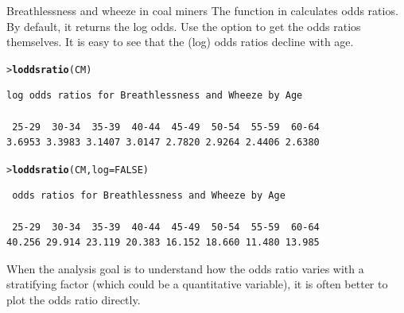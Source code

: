\documentclass[10pt,krantz2]{krantz}\usepackage[]{graphicx}\usepackage[]{color}
\makeatletter
\newcommand{\hlnum}[1]{\textcolor[rgb]{0.686,0.059,0.569}{#1}}%
\newcommand{\hlstd}[1]{\textcolor[rgb]{0.345,0.345,0.345}{#1}}%
\newcommand{\hlkwc}[1]{\textcolor[rgb]{0.333,0.667,0.333}{#1}}%
\newcommand{\hlkwd}[1]{\textcolor[rgb]{0.737,0.353,0.396}{\textbf{#1}}}%
\newenvironment{kframe}{%
 \def\at@end@of@kframe{}%
 \ifinner\ifhmode%
  \def\at@end@of@kframe{\end{minipage}}%
  \begin{minipage}{\columnwidth}%
 \fi\fi%
 \def\FrameCommand##1{\hskip\@totalleftmargin \hskip-\fboxsep
 \colorbox{shadecolor}{##1}\hskip-\fboxsep
     \hskip-\linewidth \hskip-\@totalleftmargin \hskip\columnwidth}%
 \MakeFramed {\advance\hsize-\width
   \@totalleftmargin\z@ \linewidth\hsize
   \@setminipage}}%
 {\par\unskip\endMakeFramed%
 \at@end@of@kframe}
\newenvironment{knitrout}{}{} %
\renewenvironment{knitrout}{\small\renewcommand{\baselinestretch}{.85}}{} %
\makeatother
\begin{document}
\begin{Example}[wheeze1]{Breathlessness and wheeze in coal miners}
The  function in  calculates odds ratios.  
By default, it returns the
log odds.  Use the option  to get the odds ratios
themselves.  It is easy to see that the (log) odds ratios decline
with age.
\begin{knitrout}
\color{fgcolor}\begin{kframe}
\begin{alltt}
\hlstd{> }\hlkwd{loddsratio}\hlstd{(CM)}
\end{alltt}
\begin{verbatim}
log odds ratios for Breathlessness and Wheeze by Age 

 25-29  30-34  35-39  40-44  45-49  50-54  55-59  60-64 
3.6953 3.3983 3.1407 3.0147 2.7820 2.9264 2.4406 2.6380 
\end{verbatim}
\begin{alltt}
\hlstd{> }\hlkwd{loddsratio}\hlstd{(CM,} \hlkwc{log} \hlstd{=} \hlnum{FALSE}\hlstd{)}
\end{alltt}
\begin{verbatim}
 odds ratios for Breathlessness and Wheeze by Age 

 25-29  30-34  35-39  40-44  45-49  50-54  55-59  60-64 
40.256 29.914 23.119 20.383 16.152 18.660 11.480 13.985 
\end{verbatim}
\end{kframe}
\end{knitrout}
When the analysis goal is to understand how the odds ratio varies
with a stratifying factor (which could be a quantitative variable),
it is often better to plot the odds ratio directly.


\end{Example}
\end{document}
